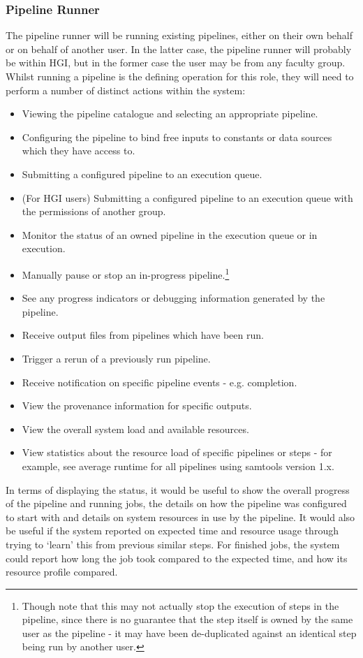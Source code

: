 \documentclass[10pt,a4paper]{article}
\newcommand{\npar}{\par\noindent\space}
\begin{document}
\subsubsection{Pipeline Runner}
\npar The pipeline runner will be running existing pipelines, either on their own behalf or on behalf of another user. In the latter case, the pipeline runner will probably be within HGI, but in the former case the user may be from any faculty group. Whilst running a pipeline is the defining operation for this role, they will need to perform a number of distinct actions within the system:
\begin{itemize}
\item Viewing the pipeline catalogue and selecting an appropriate pipeline.
\item Configuring the pipeline to bind free inputs to constants or data sources which they have access to.
\item Submitting a configured pipeline to an execution queue.
\item (For HGI users) Submitting a configured pipeline to an execution queue with the permissions of another group.
\item Monitor the status of an owned pipeline in the execution queue or in execution.
\item Manually pause or stop an in-progress pipeline.\footnote{Though note that this may not actually stop the execution of steps in the pipeline, since there is no guarantee that the step itself is owned by the same user as the pipeline - it may have been de-duplicated against an identical step being run by another user.}
\item See any progress indicators or debugging information generated by the pipeline.
\item Receive output files from pipelines which have been run.
\item Trigger a rerun of a previously run  pipeline.
\item Receive notification on specific pipeline events - e.g. completion.
\item View the provenance information for specific outputs.
\item View the overall system load and available resources.
\item View statistics about the resource load of specific pipelines or steps - for example, see average runtime for all pipelines using samtools version 1.x.
\end{itemize}
\npar In terms of displaying the status, it would be useful to show the overall progress of the pipeline and running jobs, the details on how the pipeline was configured to start with and details on system resources in use by the pipeline. It would also be useful if the system reported on expected time and resource usage through trying to `learn' this from previous similar steps. For finished jobs, the system could report how long the job took compared to the expected time, and how its resource profile compared.
\end{document}
